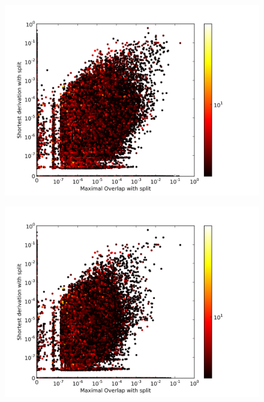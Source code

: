 \begin{figure}
\center
\includegraphics[width=\linewidth]{../data/plots/plot2.png}
\end{figure}


\begin{figure}
\center
\includegraphics[width=\linewidth]{../data/plots/plot3.png}
\end{figure}